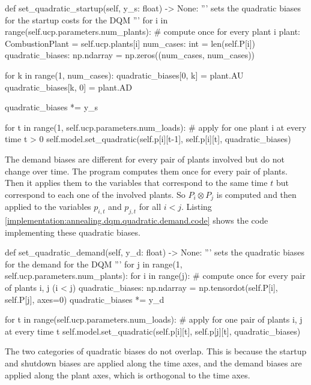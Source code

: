 \begin{python}[
  float,
  caption={Implementation of the Quadratic Startup and Shutdown Biases for DQMs},
  label={implementation:annealing.dqm.quadratic.startup.code}
]
def set_quadratic_startup(self, y_s: float) -> None:
  '''
  sets the quadratic biases for the startup costs for the DQM
  '''
  for i in range(self.ucp.parameters.num_plants):
    # compute once for every plant i
    plant: CombustionPlant = self.ucp.plants[i]
    num_cases: int = len(self.P[i])
    quadratic_biases: np.ndarray = np.zeros((num_cases, num_cases))

    for k in range(1, num_cases):
      quadratic_biases[0, k] = plant.AU
      quadratic_biases[k, 0] = plant.AD

    quadratic_biases *= y_s

    for t in range(1, self.ucp.parameters.num_loads):
      # apply for one plant i at every time t > 0
      self.model.set_quadratic(self.p[i][t-1], self.p[i][t], quadratic_biases)
\end{python}

The demand biases are different for every pair of plants involved but do not change over time.
The program computes them once for every pair of plants.
Then it applies them to the variables that correspond to the same time $t$ but correspond to each one of the involved plants.
So $P_i \otimes P_j$ is computed and then applied to the variables $p_{i, t}$ and $p_{j, t}$ for all $i < j$.
Listing \ref{implementation:annealing.dqm.quadratic.demand.code} shows the code implementing these quadratic biases.

\begin{python}[
  float,
  caption={Implementation of the Quadratic Demand Biases for DQMs},
  label={implementation:annealing.dqm.quadratic.demand.code}
]
def set_quadratic_demand(self, y_d: float) -> None:
  '''
  sets the quadratic biases for the demand for the DQM
  '''
  for j in range(1, self.ucp.parameters.num_plants):
    for i in range(j):
      # compute once for every pair of plants i, j (i < j)
      quadratic_biases: np.ndarray = np.tensordot(self.P[i], self.P[j], axes=0)
      quadratic_biases *= y_d

      for t in range(self.ucp.parameters.num_loads):
        # apply for one pair of plants i, j at every time t
        self.model.set_quadratic(self.p[i][t], self.p[j][t], quadratic_biases)
\end{python}

The two categories of quadratic biases do not overlap.
This is because the startup and shutdown biases are applied along the time axes, and the demand biases are applied along the plant axes, which is orthogonal to the time axes.

